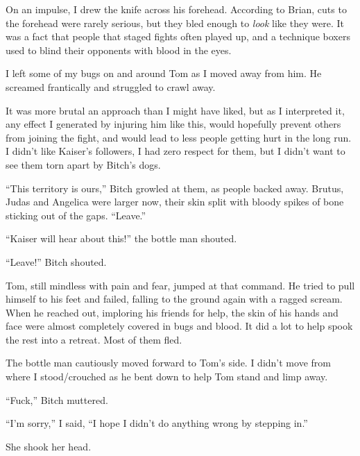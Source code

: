 On an impulse, I drew the knife across his forehead.  According to Brian, cuts to the forehead were rarely serious, but they bled enough to \emph{look} like they were.  It was a fact that people that staged fights often played up, and a technique boxers used to blind their opponents with blood in the eyes.



I left some of my bugs on and around Tom as I moved away from him.  He screamed frantically and struggled to crawl away.



It was more brutal an approach than I might have liked, but as I interpreted it, any effect I generated by injuring him like this, would hopefully prevent others from joining the fight, and would lead to less people getting hurt in the long run.  I didn't like Kaiser's followers, I had zero respect for them, but I didn't want to see them torn apart by Bitch's dogs.



``This territory is ours,'' Bitch growled at them, as people backed away.  Brutus, Judas and Angelica were larger now, their skin split with bloody spikes of bone sticking out of the gaps.  ``Leave.''



``Kaiser will hear about this!'' the bottle man shouted.



``Leave!'' Bitch shouted.



Tom, still mindless with pain and fear, jumped at that command.  He tried to pull himself to his feet and failed, falling to the ground again with a ragged scream.  When he reached out, imploring his friends for help, the skin of his hands and face were almost completely covered in bugs and blood.  It did a lot to help spook the rest into a retreat.  Most of them fled.



The bottle man cautiously moved forward to Tom's side.  I didn't move from where I stood/crouched as he bent down to help Tom stand and limp away.



``Fuck,'' Bitch muttered.



``I'm sorry,'' I said, ``I hope I didn't do anything wrong by stepping in.''



She shook her head.



